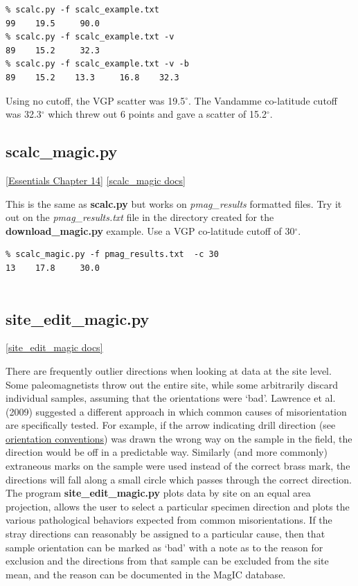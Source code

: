 \documentclass[11pt]{book}
\begin{document}
{{\begin{verbatim}
% scalc.py -f scalc_example.txt 
99    19.5     90.0
% scalc.py -f scalc_example.txt -v
89    15.2     32.3 
% scalc.py -f scalc_example.txt -v -b 
89    15.2    13.3     16.8    32.3 
\end{verbatim}

Using no cutoff, the VGP scatter was 19.5$^{\circ}$.  The Vandamme co-latitude cutoff was 32.3$^{\circ}$ which threw out 6 points and gave a scatter of 15.2$^{\circ}$.   

\subsection{scalc\_magic.py} 
\href{http://magician.ucsd.edu/Essentials_2/WebBook2ch14.html#ch14}{[Essentials Chapter 14]}
\href{http://earthref.org/PmagPy/pmagpydocs/scalc_magic-module.html}{[scalc\_magic docs]}

This is the same as {\bf scalc.py} but works on {\it pmag\_results} formatted files.   Try it out on the {\it pmag\_results.txt} file in the directory created for the {\bf download\_magic.py} example. Use a VGP co-latitude cutoff of 30$^{\circ}$.  

\begin{verbatim}
% scalc_magic.py -f pmag_results.txt  -c 30
13    17.8     30.0 
 
\end{verbatim}

\subsection{site\_edit\_magic.py}
\href{http://earthref.org/PmagPy/pmagpydocs/site_edit_magic-module.html}{[site\_edit\_magic docs]}

There are frequently outlier directions when looking at data at the site level.  Some paleomagnetists throw out the entire site, while some arbitrarily discard individual samples, assuming that the orientations were `bad'.  Lawrence et al. (2009) \nocite{lawrence09} suggested a different approach in which common causes of misorientation are specifically tested.  For example, if the arrow indicating drill direction (see \href{#orientiation\_magic.py}{orientation conventions}) was drawn the wrong way on the sample in the field, the direction would be off in a predictable way.  Similarly (and more commonly) extraneous marks on the sample were used instead of the correct brass mark, the directions will fall along a small circle which passes through the correct direction.  The program {\bf site\_edit\_magic.py} plots data by site on an equal area projection, allows the user to select a particular specimen direction and plots the various pathological behaviors expected from common misorientations.  If the stray directions can reasonably be assigned to a particular cause, then that sample orientation can be marked as `bad' with a note as to the reason for exclusion and the directions from that sample can be excluded from the site mean, and the reason can be documented in the MagIC database.    

}}
\end{document}
